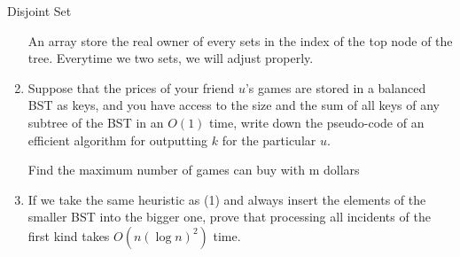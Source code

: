 \begin{homeworkProblem}{Disjoint Set}
\begin{enumerate}[label=(\arabic*)]
            An array  store the real owner of every sets in the index 
            of the top node of the tree. Everytime we  two sets, we will 
            adjust  properly.

            \pagebreak
        \item
            Suppose that the prices of your friend $u$'s games are stored in a
            balanced BST as keys, and you have access to the size and the sum of
            all keys of any subtree of the BST in an $O(1)$ time, write down the
            pseudo-code of an efficient algorithm for outputting $k$ for the 
            particular $u$.

            \begin{algorithm}[]
                \begin{algorithmic}[1]
                    \EndIf
                    \EndIf
                    \EndWhile
                    \EndIf
                    \EndFunction{}
                \end{algorithmic}
                \caption{Find the maximum number of games can buy with m dollars}
            \end{algorithm}

        \item
            If we take the same heuristic as (1) and always insert the elements
            of the smaller BST into the bigger one, prove that processing all
            incidents of the first kind takes $O(n(\log n)^2)$ time.


\end{enumerate}
\end{homeworkProblem}
